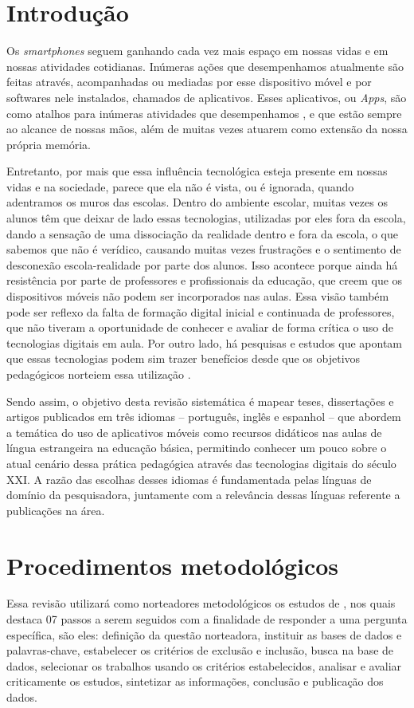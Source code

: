 \documentclass{textolivre}
\begin{document}
\section{Introdução}\label{sec-intro}
Os \textit{smartphones} seguem ganhando cada vez mais espaço em nossas vidas e em nossas atividades cotidianas. Inúmeras ações que desempenhamos atualmente são feitas através, acompanhadas ou mediadas por esse dispositivo móvel e por softwares nele instalados, chamados de aplicativos. Esses aplicativos, ou \textit{Apps}, são como atalhos para inúmeras atividades que desempenhamos \cite{gardner2014}, e que estão sempre ao alcance de nossas mãos, além de muitas vezes atuarem como extensão da nossa própria memória.

Entretanto, por mais que essa influência tecnológica esteja presente em nossas vidas e na sociedade, parece que ela não é vista, ou é ignorada, quando adentramos os muros das escolas. Dentro do ambiente escolar, muitas vezes os alunos têm que deixar de lado essas tecnologias, utilizadas por eles fora da escola, dando a sensação de uma dissociação da realidade dentro e fora da escola, o que sabemos que não é verídico, causando muitas vezes frustrações e o sentimento de desconexão escola-realidade por parte dos alunos. Isso acontece porque ainda há resistência por parte de professores e profissionais da educação, que creem que os dispositivos móveis não podem ser incorporados nas aulas. Essa visão também pode ser reflexo da falta de formação digital inicial e continuada de professores, que não tiveram a oportunidade de conhecer e avaliar de forma crítica o uso de tecnologias digitais em aula. Por outro lado, há pesquisas e estudos que apontam que essas tecnologias podem sim trazer benefícios desde que os objetivos pedagógicos norteiem essa utilização \cite{bannell2016, gardner2014, karsenti2014, perezgomez2012, saccol2011, unesco}.
	
Sendo assim, o objetivo desta revisão sistemática é mapear teses, dissertações e artigos publicados em três idiomas – português, inglês e espanhol – que abordem a temática do uso de aplicativos móveis como recursos didáticos nas aulas de língua estrangeira na educação básica, permitindo conhecer um pouco sobre o atual cenário dessa prática pedagógica através das tecnologias digitais do século XXI. A razão das escolhas desses idiomas é fundamentada pelas línguas de domínio da pesquisadora, juntamente com a relevância dessas línguas referente a publicações na área.

\section{Procedimentos metodológicos}
Essa revisão utilizará como norteadores metodológicos os estudos de \textcite{rother2007}, nos quais destaca 07 passos a serem seguidos com a finalidade de responder a uma pergunta específica, são eles: definição da questão norteadora, instituir as bases de dados e palavras-chave, estabelecer os critérios de exclusão e inclusão, busca na base de dados, selecionar os trabalhos usando os critérios estabelecidos, analisar e avaliar criticamente os estudos, sintetizar as informações, conclusão e publicação dos dados. 
\end{document}
